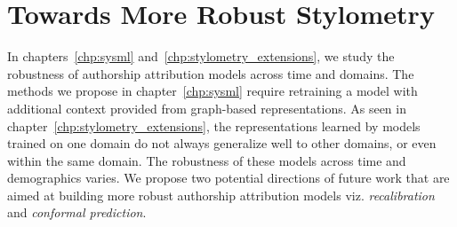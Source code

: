 \section{Towards More Robust Stylometry}

In chapters~\ref{chp:sysml} and~\ref{chp:stylometry_extensions}, we study the robustness of authorship attribution models across time and domains.
The methods we propose in chapter~\ref*{chp:sysml} require retraining a model with additional context provided from graph-based representations.
As seen in chapter~\ref*{chp:stylometry_extensions}, the representations learned by models trained on one domain do not always generalize well to other domains, or even within the same domain.
The robustness of these models across time and demographics varies.
We propose two potential directions of future work that are aimed at building more robust authorship attribution models viz. \emph{recalibration} and \emph{conformal prediction}.

